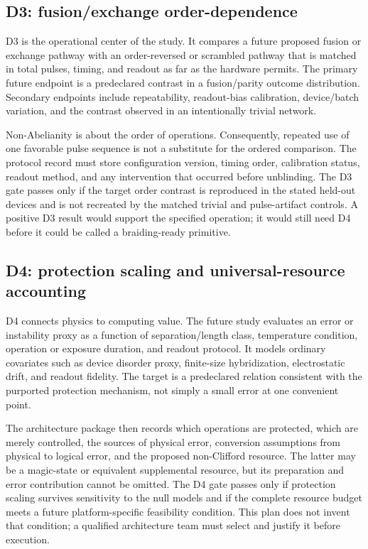 \documentclass[conference]{IEEEtran}
\begin{document}
\subsection{D3: fusion/exchange order-dependence}

D3 is the operational center of the study. It compares a future proposed fusion or exchange pathway with an order-reversed or scrambled pathway that is matched in total pulses, timing, and readout as far as the hardware permits. The primary future endpoint is a predeclared contrast in a fusion/parity outcome distribution. Secondary endpoints include repeatability, readout-bias calibration, device/batch variation, and the contrast observed in an intentionally trivial network.

Non-Abelianity is about the order of operations. Consequently, repeated use of one favorable pulse sequence is not a substitute for the ordered comparison. The protocol record must store configuration version, timing order, calibration status, readout method, and any intervention that occurred before unblinding. The D3 gate passes only if the target order contrast is reproduced in the stated held-out devices and is not recreated by the matched trivial and pulse-artifact controls. A positive D3 result would support the specified operation; it would still need D4 before it could be called a braiding-ready primitive.

\subsection{D4: protection scaling and universal-resource accounting}

D4 connects physics to computing value. The future study evaluates an error or instability proxy as a function of separation/length class, temperature condition, operation or exposure duration, and readout protocol. It models ordinary covariates such as device disorder proxy, finite-size hybridization, electrostatic drift, and readout fidelity. The target is a predeclared relation consistent with the purported protection mechanism, not simply a small error at one convenient point.

The architecture package then records which operations are protected, which are merely controlled, the sources of physical error, conversion assumptions from physical to logical error, and the proposed non-Clifford resource. The latter may be a magic-state or equivalent supplemental resource, but its preparation and error contribution cannot be omitted. The D4 gate passes only if protection scaling survives sensitivity to the null models and if the complete resource budget meets a future platform-specific feasibility condition. This plan does not invent that condition; a qualified architecture team must select and justify it before execution.
\end{document}

